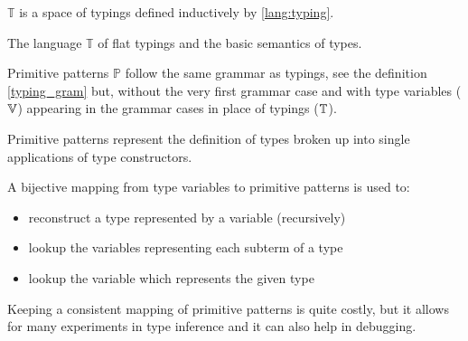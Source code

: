 \begin{defn}[Typings]
    \label{typing_gram}
    $\mathbb{T}$ is a space of typings defined inductively by \cref{lang:typing}.
\end{defn}

\begin{lang}
  \def\grammarP{0.6}
  \begin{grammar}
  \end{grammar}
  \caption{The language $\mathbb{T}$ of flat typings and the basic semantics of types.}
  \label{lang:typing}
\end{lang}

\begin{defn}
    Primitive patterns $\mathbb{P}$ follow the same grammar as typings, see the definition \ref{typing_gram} but, without the very first grammar case and with type variables ($\mathbb{V}$) appearing in the grammar cases in place of typings ($\mathbb{T}$).

    Primitive patterns represent the definition of types broken up into single applications of type constructors.
\end{defn}

\begin{remark}
    A bijective mapping from type variables to primitive patterns is used to:

    \begin{itemize}
        \item reconstruct a type represented by a variable (recursively)
        \item lookup the variables representing each subterm of a type
        \item lookup the variable which represents the given type 
    \end{itemize}

    Keeping a consistent mapping of primitive patterns is quite costly, but it allows for many experiments in type inference and it can also help in debugging.
\end{remark}

